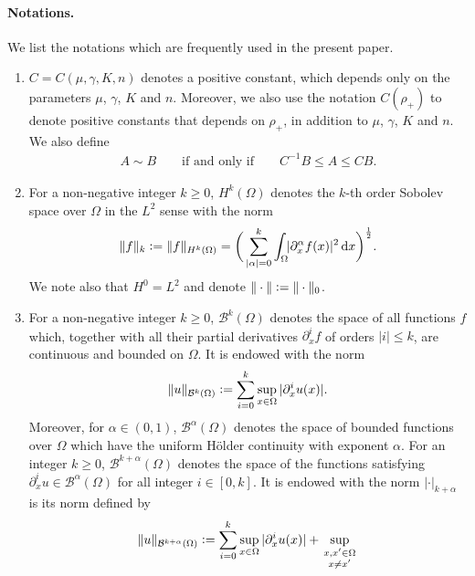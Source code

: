 \documentclass[a4paper,12pt,draft]{article}
\theoremstyle{remark}
\def\d{\partial}
\def\dif{{\mathrm d}}
\def\mB{\mathcal{B}}
\def\lpp#1{\|#1\|}
\begin{document}
\paragraph{\bf Notations.} 
We list the notations which are frequently used in the present paper.
\begin{enumerate}[label=\textnormal{(\arabic*)},ref=\textnormal{(\arabic*)}]
\item\label{item:cons} $C=C(\mu,\gamma,K,n)$ denotes a positive constant, which depends only on the parameters $\mu$, $\gamma$, $K$ and $n$. Moreover, we also use the notation $C(\rho_+)$ to denote positive constants that depends on $\rho_+$, in addition to $\mu$, $\gamma$, $K$ and $n$. We also define
\begin{align*}
    A\sim B \qquad \text{if and only if} \qquad C^{-1}B \le A \le C B.  
\end{align*}
\item For a non-negative integer $k \ge 0$, $H^k(\Omega)$ denotes the $k$-th order Sobolev space over $\Omega$ in the $L^2$ sense with the norm
\begin{equation*}
\| f \|_k\vcentcolon= \|f\|_{H^{k}(\Omega)} = \bigg( \sum_{|\alpha|=0}^{k} \int_{\Omega}\!\!  |\d_x^{\alpha} f (x)|^2 \, \dif x \bigg)^{\frac{1}{2}}.
\end{equation*}
We note also that $H^0 = L^2$ and denote $\lpp{\cdot}  \vcentcolon= \| \cdot \|_0$.
\item For a non-negative integer $k\ge 0$, $\mB^k(\Omega)$ denotes the space of all functions $f$ which, together with all their partial derivatives $\d_x^{i}f$ of orders $|i|\le k$, are continuous and bounded on $\Omega$. It is endowed with the norm
\begin{equation*}
\|u \|_{\mB^k(\Omega)}
\vcentcolon= \sum_{i=0}^k \sup_{x \in \Omega} |\d_x^i u(x)|.
\end{equation*}
Moreover, for $\alpha \in (0,1)$, $\mB^\alpha (\Omega)$ denotes the
space of bounded functions over $\Omega$ which have the
uniform H\"older continuity with exponent $\alpha$.
For an integer $k\ge 0$,  $\mB^{k+\alpha}(\Omega)$ denotes the space of the functions satisfying %
$\d_x^{i} u \in \mB^\alpha (\Omega)$ for all integer $i \in [0, k]$. It is endowed with the norm
$|\cdot|_{k+\alpha}$ is its norm defined by
\begin{equation*}
 \|u\|_{\mB^{k+\alpha}(\Omega)}
\vcentcolon= \sum_{i=0}^k \sup_{x \in \Omega} |\d_x^i u(x)|
+ \sup_{\begin{smallmatrix} x,x' \in \Omega \\ x \neq x' \end{smallmatrix}}

\end{equation*}
\end{enumerate}
\end{document}
